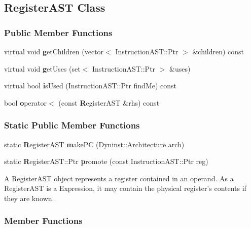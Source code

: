 \subsection{RegisterAST Class}
\label{sec:registerAST}

\label{classDyninst_1_1InstructionAPI_1_1RegisterAST}
\subsubsection*{Public Member Functions}
\begin{DoxyCompactItemize}
\item 
virtual void {\textbf getChildren} (vector$<$ InstructionAST::Ptr $>$ \&children) const 
\item 
virtual void {\textbf getUses} (set$<$ InstructionAST::Ptr $>$ \&uses)
\item 
virtual bool {\textbf isUsed} (InstructionAST::Ptr findMe) const 
\item 
bool {\textbf operator$<$} (const {\textbf RegisterAST} \&rhs) const 
\end{DoxyCompactItemize}
\subsubsection*{Static Public Member Functions}
\begin{DoxyCompactItemize}
\item 
static {\textbf RegisterAST} {\textbf makePC} (Dyninst::Architecture arch)
\item 
static {\textbf RegisterAST::Ptr} {\textbf promote} (const InstructionAST::Ptr reg)
\end{DoxyCompactItemize}



A RegisterAST object represents a register contained in an operand. As a RegisterAST is a Expression, it may contain the physical register's contents if they are known. 

\subsubsection{Member Functions}
